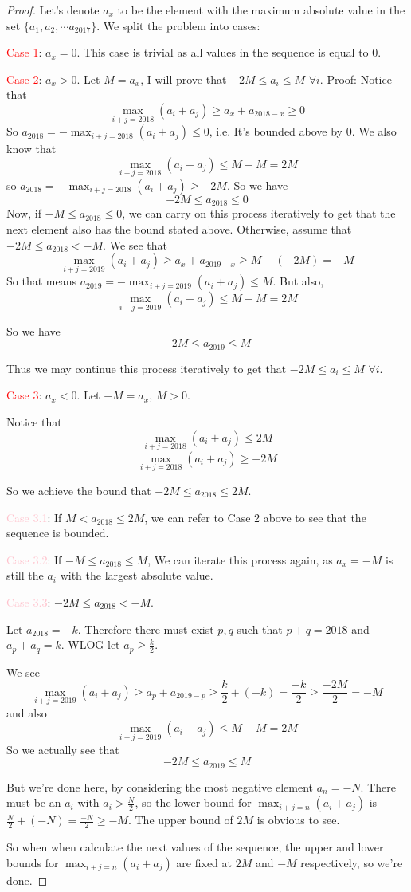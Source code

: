 \documentclass{article}
\theoremstyle{mytheoremstyle}
\theoremstyle{mytheoremstyle}
\theoremstyle{myproblemstyle}
\begin{document}
    \begin{proof}

Let's denote $a_x$ to be the element with the maximum absolute value in the set $\{a_1, a_2, \cdots a_{2017}\}$. We split the problem into cases:

\textcolor{red}{Case 1}: $a_x = 0$. This case is trivial as all values in the sequence is equal to $0$.
\vspace{5pt}

\textcolor{red}{Case 2}: $a_x > 0$. Let $M = a_x$, I will prove that $-2M \leq a_i \leq M$ $\forall i$.
Proof: Notice that $$\max_{i+j=2018}(a_i+a_j) \geq a_{x} + a_{2018 - x} \geq 0$$
So $a_{2018} = -\max_{i+j=2018}(a_i+a_j) \leq 0$, i.e. It's bounded above by 0.
We also know that $$\max_{i+j=2018}(a_i+a_j) \leq M + M = 2M$$ so $a_{2018} = - \max_{i+j=2018}(a_i+a_j) \geq -2M$. So we have $$-2M \leq a_{2018} \leq 0$$
Now, if $-M \leq a_{2018} \leq 0$, we can carry on this process iteratively to get that the next element also has the bound stated above. Otherwise, assume that $-2M \leq a_{2018} < -M$. We see that $$\max_{i+j=2019}(a_i+a_j) \geq a_x + a_{2019-x} \geq M + (-2M) = -M$$
So that means $a_{2019} = -\max_{i+j=2019}(a_i+a_j) \leq M$. But also, $$\max_{i+j=2019}(a_i+a_j) \leq M + M = 2M$$
    
So we have $$-2M \leq a_{2019} \leq M$$

Thus we may continue this process iteratively to get that $-2M \leq a_i \leq M$ $\forall i$.



\textcolor{red}{Case 3}: $a_x < 0$. Let $-M = a_x$, $M > 0$. 

Notice that $$\max_{i+j=2018}(a_i+a_j) \leq 2M$$
$$\max_{i+j=2018}(a_i+a_j) \geq -2M$$

So we achieve the bound that $-2M \leq a_{2018} \leq 2M$. 


\textcolor{pink}{Case 3.1}: If $M < a_{2018} \leq 2M$, we can refer to Case 2 above to see that the sequence is bounded.

\textcolor{pink}{Case 3.2}: If $-M \leq a_{2018} \leq M$, We can iterate this process again, as $a_x = -M$ is still the $a_i$ with the largest absolute value. 


\textcolor{pink}{Case 3.3}: $-2M \leq a_{2018} < -M$.

Let $a_{2018} = -k$. Therefore there must exist $p, q$ such that $p + q = 2018$ and $a_p + a_q = k$. WLOG let $a_p \geq \frac{k}{2}$.

We see $$\max_{i+j=2019}(a_i+a_j) \geq a_p + a_{2019 - p} \geq \frac{k}{2} + (-k) = \frac{-k}{2} \geq \frac{-2M}{2} = -M$$
and also $$\max_{i+j=2019}(a_i+a_j) \leq M + M = 2M$$ So we actually see that 
$$-2M \leq a_{2019} \leq M$$

But we're done here, by considering the most negative element $a_n = -N$. There must be an $a_i$ with $a_i > \frac{N}{2}$, so the lower bound for $\max_{i+j=n}(a_i+a_j)$ is $\frac{N}{2} + (-N) = \frac{-N}{2} \geq -M$. The upper bound of $2M$ is obvious to see.

So when when calculate the next values of the sequence, the upper and lower bounds for $\max_{i+j=n}(a_i+a_j)$ are fixed at $2M$ and $-M$ respectively, so we're done.


    \end{proof}
\end{document}
